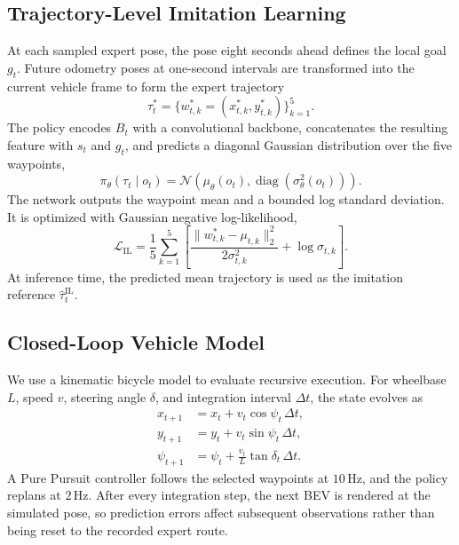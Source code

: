 \subsection{Trajectory-Level Imitation Learning}

At each sampled expert pose, the pose eight seconds ahead defines the local goal $g_t$. Future odometry poses at one-second intervals are transformed into the current vehicle frame to form the expert trajectory
\begin{equation}
\tau_t^*=\{w_{t,k}^*=(x_{t,k}^*,y_{t,k}^*)\}_{k=1}^{5}.
\label{eq:expert_target}
\end{equation}
The policy encodes $B_t$ with a convolutional backbone, concatenates the resulting feature with $s_t$ and $g_t$, and predicts a diagonal Gaussian distribution over the five waypoints,
\begin{equation}
\pi_\theta(\tau_t\mid o_t)=
\mathcal{N}\!\left(\mu_\theta(o_t),
\operatorname{diag}(\sigma_\theta^2(o_t))\right).
\label{eq:policy}
\end{equation}
The network outputs the waypoint mean and a bounded log standard deviation. It is optimized with Gaussian negative log-likelihood,
\begin{equation}
\mathcal{L}_{\mathrm{IL}}=
\frac{1}{5}\sum_{k=1}^{5}
\left[
\frac{\|w_{t,k}^*-\mu_{t,k}\|_2^2}{2\sigma_{t,k}^2}
+\log \sigma_{t,k}
\right].
\label{eq:il}
\end{equation}
At inference time, the predicted mean trajectory is used as the imitation reference $\hat{\tau}^{\mathrm{IL}}_t$.

\subsection{Closed-Loop Vehicle Model}

We use a kinematic bicycle model to evaluate recursive execution. For wheelbase $L$, speed $v$, steering angle $\delta$, and integration interval $\Delta t$, the state evolves as
\begin{align}
x_{t+1} &= x_t+v_t\cos\psi_t\,\Delta t,\\
y_{t+1} &= y_t+v_t\sin\psi_t\,\Delta t,\\
\psi_{t+1} &= \psi_t+\frac{v_t}{L}\tan\delta_t\,\Delta t.
\end{align}
A Pure Pursuit controller follows the selected waypoints at $10\,\mathrm{Hz}$, and the policy replans at $2\,\mathrm{Hz}$. After every integration step, the next BEV is rendered at the simulated pose, so prediction errors affect subsequent observations rather than being reset to the recorded expert route.

